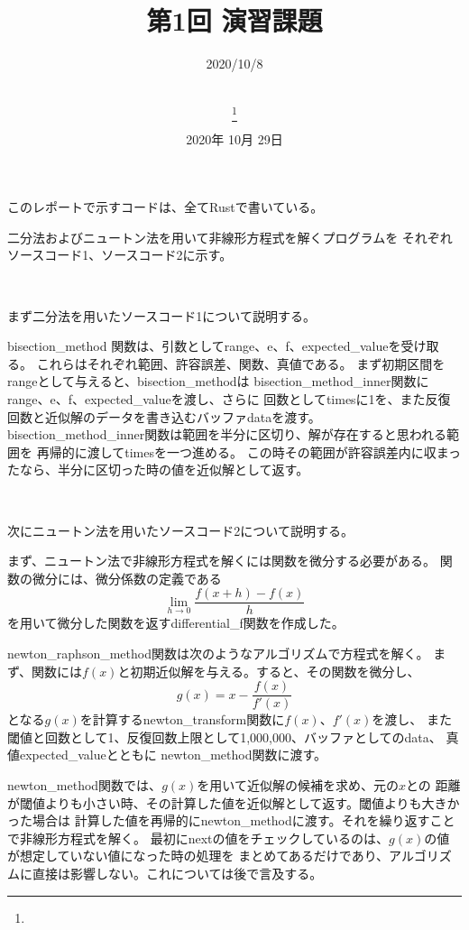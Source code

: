 \documentclass[uplatex, 11pt,a4j, titlepage]{jsarticle}
\title{第1回 演習課題}
\date{2020年 10月 29日}
\author{
    \small{\myid} \\
    \myname\thanks{\mymail}
}
\begin{document}
\maketitle


\subtitle{2020/10/8}

このレポートで示すコードは、全てRustで書いている。


二分法およびニュートン法を用いて非線形方程式を解くプログラムを
それぞれソースコード1、ソースコード2に示す。

\ 

まず二分法を用いたソースコード1について説明する。

bisection\_method 関数は、引数としてrange、e、f、expected\_valueを受け取る。
これらはそれぞれ範囲、許容誤差、関数、真値である。
まず初期区間をrangeとして与えると、bisection\_methodは
bisection\_method\_inner関数にrange、e、f、expected\_valueを渡し、さらに
回数としてtimesに1を、また反復回数と近似解のデータを書き込むバッファdataを渡す。
bisection\_method\_inner関数は範囲を半分に区切り、解が存在すると思われる範囲を
再帰的に渡してtimesを一つ進める。
この時その範囲が許容誤差内に収まったなら、半分に区切った時の値を近似解として返す。

\ 

次にニュートン法を用いたソースコード2について説明する。

まず、ニュートン法で非線形方程式を解くには関数を微分する必要がある。
関数の微分には、微分係数の定義である
\begin{equation}
    \lim_{h \to 0} \frac{f(x + h) - f(x)}{h}   
\end{equation}
を用いて微分した関数を返すdifferential\_f関数を作成した。

newton\_raphson\_method関数は次のようなアルゴリズムで方程式を解く。
まず、関数には$f(x)$と初期近似解を与える。すると、その関数を微分し、
\begin{equation}
    g(x) = x - \frac{f(x)}{f'(x)}
\end{equation}
となる$g(x)$を計算するnewton\_transform関数に$f(x)$、$f'(x)$を渡し、
また閾値と回数として1、反復回数上限として1,000,000、バッファとしてのdata、
真値expected\_valueとともに
newton\_method関数に渡す。

newton\_method関数では、$g(x)$を用いて近似解の候補を求め、元の$x$との
距離が閾値よりも小さい時、その計算した値を近似解として返す。閾値よりも大きかった場合は
計算した値を再帰的にnewton\_methodに渡す。それを繰り返すことで非線形方程式を解く。
最初にnextの値をチェックしているのは、$g(x)$の値が想定していない値になった時の処理を
まとめてあるだけであり、アルゴリズムに直接は影響しない。これについては後で言及する。
\end{document}
